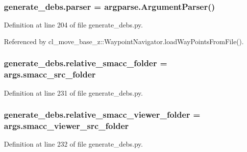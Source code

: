 \subsubsection[{\texorpdfstring{parser}{parser}}]{\setlength{\rightskip}{0pt plus 5cm}generate\+\_\+debs.\+parser = argparse.\+Argument\+Parser()}\hypertarget{namespacegenerate__debs_a4a9ae4bb85fc62d7973ea3d09ced6c26}{}\label{namespacegenerate__debs_a4a9ae4bb85fc62d7973ea3d09ced6c26}


Definition at line 204 of file generate\+\_\+debs.\+py.



Referenced by cl\+\_\+move\+\_\+base\+\_\+z\+::\+Waypoint\+Navigator.\+load\+Way\+Points\+From\+File().

\subsubsection[{\texorpdfstring{relative\+\_\+smacc\+\_\+folder}{relative_smacc_folder}}]{\setlength{\rightskip}{0pt plus 5cm}generate\+\_\+debs.\+relative\+\_\+smacc\+\_\+folder = args.\+smacc\+\_\+src\+\_\+folder}\hypertarget{namespacegenerate__debs_abf6925bd06ac1da3981fe638eefb5a61}{}\label{namespacegenerate__debs_abf6925bd06ac1da3981fe638eefb5a61}


Definition at line 231 of file generate\+\_\+debs.\+py.

\subsubsection[{\texorpdfstring{relative\+\_\+smacc\+\_\+viewer\+\_\+folder}{relative_smacc_viewer_folder}}]{\setlength{\rightskip}{0pt plus 5cm}generate\+\_\+debs.\+relative\+\_\+smacc\+\_\+viewer\+\_\+folder = args.\+smacc\+\_\+viewer\+\_\+src\+\_\+folder}\hypertarget{namespacegenerate__debs_a22d892b78adfce583710d78737eb4747}{}\label{namespacegenerate__debs_a22d892b78adfce583710d78737eb4747}


Definition at line 232 of file generate\+\_\+debs.\+py.

